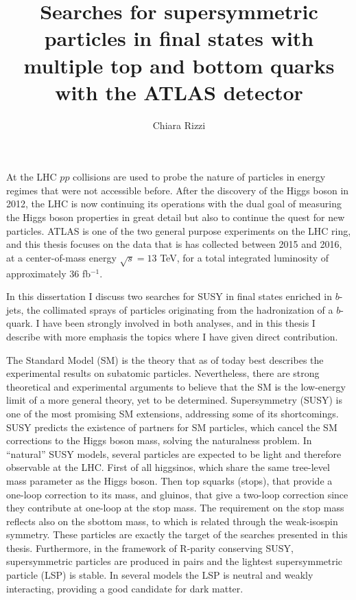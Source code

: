 \documentclass[11pt,a4paper]{article}
\title{Searches for supersymmetric particles in final states with multiple top and bottom quarks with the ATLAS detector}
\author{Chiara Rizzi}
\date{}
\newcommand{\cmtre}{\ensuremath{\sqrt{s}  =  13}\xspace}
\def\ifb{\mbox{fb$^{-1}$}} %
\begin{document}
\maketitle

At the LHC $pp$ collisions are used to probe the nature of particles in energy regimes that were not accessible before. 
After the discovery of the Higgs boson in 2012, the LHC is now continuing its operations with the dual goal 
of measuring the Higgs boson properties in great detail but also to continue the quest for new particles.
ATLAS is one of the two general purpose experiments on the LHC ring, and this thesis focuses on the data that is has collected between 
2015 and 2016, 
at a center-of-mass energy \cmtre TeV, for a total  
integrated luminosity of approximately 36 \ifb. 

In this dissertation I discuss two searches for SUSY in final states enriched in $b$-jets, the collimated sprays of 
particles originating from the hadronization of a $b$-quark. 
I have been strongly involved in both analyses, 
and in this thesis I describe with more emphasis the topics where I have given direct contribution.

The Standard Model (SM) is the theory that as of today best describes the experimental results on subatomic particles. 
Nevertheless, there are strong theoretical and experimental arguments to believe that the SM is the low-energy limit 
of a more general theory, yet to be determined. 
Supersymmetry (SUSY) is one of the most promising SM extensions, 
addressing some of its shortcomings. SUSY predicts the existence of partners for  
SM particles, which cancel the SM corrections to the Higgs boson mass, solving the naturalness problem. 
In ``natural'' SUSY models, several particles are expected to be light and therefore observable at the LHC.
First of all higgsinos, which share the same tree-level mass parameter as the Higgs boson. 
Then top squarks (stops), that provide a one-loop correction to its mass, and gluinos, that give a two-loop correction since they 
contribute at one-loop at the stop mass. 
The requirement on the stop mass reflects also on the sbottom mass, to which is related through the weak-isospin symmetry. 
These particles are exactly the target of the searches presented in this thesis.
Furthermore, in the framework of R-parity conserving SUSY, supersymmetric particles are produced in pairs and the 
lightest supersymmetric particle (LSP) is stable. 
In several models the LSP is neutral and weakly interacting, providing a good candidate for dark matter.
 
\end{document}
